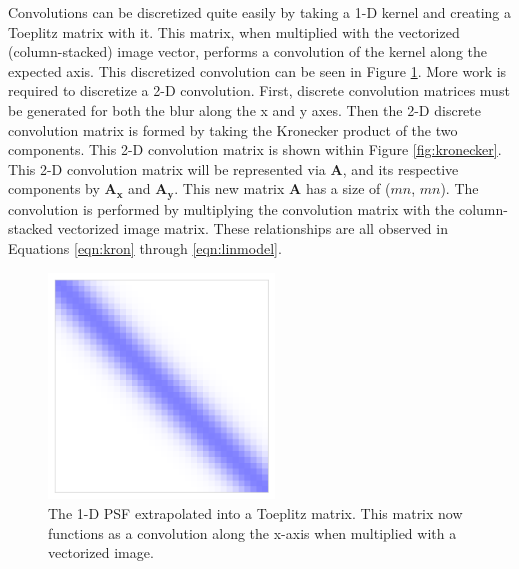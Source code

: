 \documentclass[letterpaper, 10pt, titlepage, twocolumn]{article}
\def\figurewidthalt{6cm}
\begin{document}
Convolutions can be discretized quite easily by taking a 1-D kernel and creating a Toeplitz matrix with it. This matrix, when multiplied with the vectorized (column-stacked) image vector, performs a convolution of the kernel along the expected axis. This discretized convolution can be seen in Figure \ref{fig:toeplitz}. More work is required to discretize a 2-D convolution. First, discrete convolution matrices must be generated for both the blur along the x and y axes. Then the 2-D discrete convolution matrix is formed by taking the Kronecker product of the two components. This 2-D convolution matrix is shown within Figure \ref{fig:kronecker}. This 2-D convolution matrix will be represented via \textbf{A}, and its respective components by $\mathbf{A_x}$ and $\mathbf{A_y}$. This new matrix \textbf{A} has a size of ($mn$, $mn$). The convolution is performed by multiplying the convolution matrix with the column-stacked vectorized image matrix. These relationships are all observed in Equations \eqref{eqn:kron} through \eqref{eqn:linmodel}.

\begin{figure}[H]
  \centering
  \includegraphics[width=\figurewidthalt]{toeplitz.png}
  \caption{The 1-D PSF extrapolated into a Toeplitz matrix. This matrix now functions as a convolution along the x-axis when multiplied with a vectorized image.}
  \label{fig:toeplitz}
\end{figure}
\end{document}

